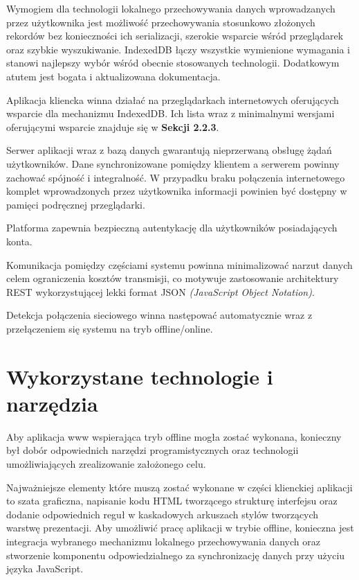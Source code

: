 Wymogiem dla technologii lokalnego przechowywania danych wprowadzanych przez użytkownika jest możliwość przechowywania stosunkowo złożonych rekordów bez konieczności ich serializacji, szerokie wsparcie wśród przeglądarek oraz szybkie wyszukiwanie. IndexedDB łączy wszystkie wymienione wymagania i stanowi najlepszy wybór wśród obecnie stosowanych technologii. Dodatkowym atutem jest bogata i aktualizowana dokumentacja.

Aplikacja kliencka winna działać na przeglądarkach internetowych oferujących wsparcie dla mechanizmu IndexedDB. Ich lista wraz z minimalnymi wersjami oferującymi wsparcie znajduje się w \textbf{Sekcji 2.2.3}.

Serwer aplikacji wraz z bazą danych gwarantują nieprzerwaną obsługę żądań użytkowników. Dane synchronizowane pomiędzy klientem a serwerem powinny zachować spójność i integralność. W przypadku braku połączenia internetowego komplet wprowadzonych przez użytkownika informacji powinien być dostępny w pamięci podręcznej przeglądarki.

Platforma zapewnia bezpieczną autentykację dla użytkowników posiadających konta.

Komunikacja pomiędzy częściami systemu powinna minimalizować narzut danych celem ograniczenia kosztów transmisji, co motywuje zastosowanie architektury REST wykorzystującej lekki format JSON \emph{(JavaScript Object Notation)}\cite{json}.

Detekcja połączenia sieciowego winna następować automatycznie wraz z przełączeniem się systemu na tryb offline/online.

\section{Wykorzystane technologie i narzędzia}
\label{sec:wykoTechnINarz}

Aby aplikacja www wspierająca tryb offline mogła zostać wykonana, konieczny był dobór odpowiednich narzędzi programistycznych oraz technologii umożliwiających zrealizowanie założonego celu.

Najważniejsze elementy które muszą zostać wykonane w części klienckiej aplikacji to szata graficzna, napisanie kodu HTML tworzącego strukturę interfejsu oraz dodanie odpowiednich reguł w kaskadowych arkuszach stylów tworzących warstwę prezentacji. Aby umożliwić pracę aplikacji w trybie offline, konieczna jest integracja wybranego mechanizmu lokalnego przechowywania danych oraz stworzenie komponentu odpowiedzialnego za synchronizację danych przy użyciu języka JavaScript.

